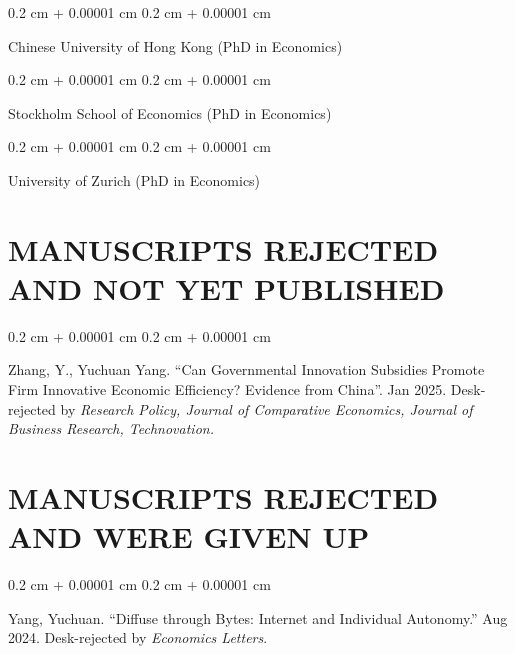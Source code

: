 \documentclass[10pt, letterpaper]{article}
\newenvironment{onecolentry}{
    \begin{adjustwidth}{
        0.2 cm + 0.00001 cm
    }{
        0.2 cm + 0.00001 cm
    }
}{
    \end{adjustwidth}
} %
\newenvironment{paper}{\vspace{.2cm}\begin{samepage}\begin{onecolentry}}{\end{onecolentry}\end{samepage}\vspace{0.2cm}}
\begin{document}
\begin{paper}
Chinese University of Hong Kong (PhD in Economics)
\end{paper}

\begin{paper}
Stockholm School of Economics (PhD in Economics)
\end{paper}

\begin{paper}
University of Zurich (PhD in Economics)
\end{paper}









\section{MANUSCRIPTS REJECTED AND NOT YET PUBLISHED}

\begin{paper}
	Zhang, Y., Yuchuan Yang. ``Can Governmental Innovation Subsidies Promote Firm Innovative Economic Efficiency? Evidence from China''. Jan 2025. Desk-rejected by \textit{Research Policy, Journal of Comparative Economics, Journal of Business Research, Technovation.}
\end{paper}


\section{MANUSCRIPTS REJECTED AND WERE GIVEN UP}

\begin{paper}
Yang, Yuchuan. ``Diffuse through Bytes: Internet and Individual Autonomy.'' Aug 2024. Desk-rejected by \textit{Economics Letters}.
\end{paper}
\end{document}
